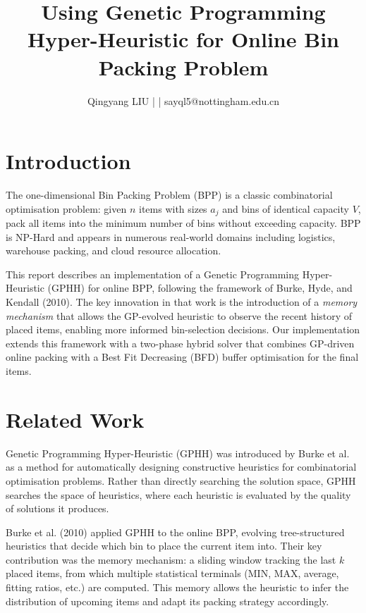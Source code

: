 \documentclass[conference]{IEEEtran}
\begin{document}
\title{Using Genetic Programming Hyper-Heuristic for Online Bin Packing Problem}

\author{Qingyang LIU \;| \;|\; sayql5@nottingham.edu.cn}

\maketitle


\section{Introduction}

The one-dimensional Bin Packing Problem (BPP) is a classic combinatorial optimisation problem: given $n$ items with sizes $a_j$ and bins of identical capacity $V$, pack all items into the minimum number of bins without exceeding capacity. BPP is NP-Hard and appears in numerous real-world domains including logistics, warehouse packing, and cloud resource allocation.

This report describes an implementation of a Genetic Programming Hyper-Heuristic (GPHH) for online BPP, following the framework of Burke, Hyde, and Kendall (2010). The key innovation in that work is the introduction of a \emph{memory mechanism} that allows the GP-evolved heuristic to observe the recent history of placed items, enabling more informed bin-selection decisions. Our implementation extends this framework with a two-phase hybrid solver that combines GP-driven online packing with a Best Fit Decreasing (BFD) buffer optimisation for the final items.


\section{Related Work}

Genetic Programming Hyper-Heuristic (GPHH) was introduced by Burke et al. as a method for automatically designing constructive heuristics for combinatorial optimisation problems. Rather than directly searching the solution space, GPHH searches the space of heuristics, where each heuristic is evaluated by the quality of solutions it produces.

Burke et al. (2010) applied GPHH to the online BPP, evolving tree-structured heuristics that decide which bin to place the current item into. Their key contribution was the memory mechanism: a sliding window tracking the last $k$ placed items, from which multiple statistical terminals (MIN, MAX, average, fitting ratios, etc.) are computed. This memory allows the heuristic to infer the distribution of upcoming items and adapt its packing strategy accordingly.
\end{document}
